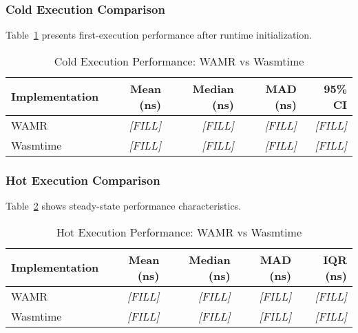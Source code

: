 \subsubsection{Cold Execution Comparison}
\label{subsubsec:cold-execution}

Table~\ref{tab:cold-performance} presents first-execution performance after runtime initialization.

\begin{table}[htbp]
\centering
\caption{Cold Execution Performance: WAMR vs Wasmtime}
\label{tab:cold-performance}
\begin{tabular}{lrrrr}
\toprule
\textbf{Implementation} & \textbf{Mean (ns)} & \textbf{Median (ns)} & \textbf{MAD (ns)} & \textbf{95\% CI} \\
\midrule
WAMR          & \textit{[FILL]} & \textit{[FILL]} & \textit{[FILL]} & \textit{[FILL]} \\
Wasmtime      & \textit{[FILL]} & \textit{[FILL]} & \textit{[FILL]} & \textit{[FILL]} \\
\bottomrule
\end{tabular}
\end{table}

\subsubsection{Hot Execution Comparison}
\label{subsubsec:hot-execution}

Table~\ref{tab:hot-performance} shows steady-state performance characteristics.

\begin{table}[htbp]
\centering
\caption{Hot Execution Performance: WAMR vs Wasmtime}
\label{tab:hot-performance}
\begin{tabular}{lrrrr}
\toprule
\textbf{Implementation} & \textbf{Mean (ns)} & \textbf{Median (ns)} & \textbf{MAD (ns)} & \textbf{IQR (ns)} \\
\midrule
WAMR          & \textit{[FILL]} & \textit{[FILL]} & \textit{[FILL]} & \textit{[FILL]} \\
Wasmtime      & \textit{[FILL]} & \textit{[FILL]} & \textit{[FILL]} & \textit{[FILL]} \\
\bottomrule
\end{tabular}
\end{table}



